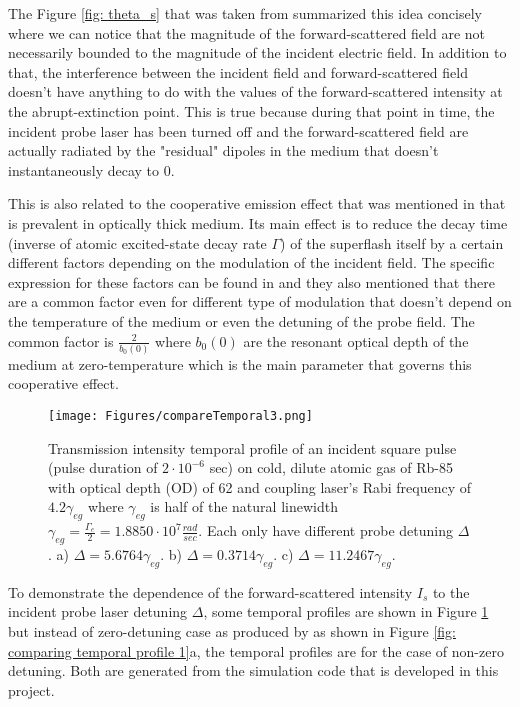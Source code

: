 The Figure \ref{fig: theta_s} that was taken from \cite{Kwong2014} summarized this idea concisely where we can notice that the magnitude of the forward-scattered field are not necessarily bounded to the magnitude of the incident electric field. In addition to that, the interference between the incident field and forward-scattered field doesn't have anything to do with the values of the forward-scattered intensity at the abrupt-extinction point. This is true because during that point in time, the incident probe laser has been turned off and the forward-scattered field are actually radiated by the "residual" dipoles in the medium that doesn't instantaneously decay to $0$.

This is also related to the cooperative emission effect that was mentioned in \cite{Kwong2014, Kwong2015, Kwong2017, Araujo2016} that is prevalent in optically thick medium. Its main effect is to reduce the decay time (inverse of atomic excited-state decay rate $\Gamma$) of the superflash itself by a certain different factors depending on the modulation of the incident field. The specific expression for these factors can be found in \cite{Kwong2017} and they also mentioned that there are a common factor even for different type of modulation that doesn't depend on the temperature of the medium or even the detuning of the probe field. The common factor is $\frac{2}{b_{0}(0)}$ where $b_{0}(0)$ are the resonant optical depth of the medium at zero-temperature which is the main parameter that governs this cooperative effect.

\begin{figure}[h!]
    \centering
    \texttt{[image: Figures/compareTemporal3.png]}
    \caption{Transmission intensity temporal profile of an incident square pulse (pulse duration of $2\cdot10^{-6}$ sec) on cold, dilute atomic gas of Rb-85 with optical depth (OD) of 62 and coupling laser's Rabi frequency of $4.2\gamma_{eg}$ where $\gamma_{eg}$ is half of the natural linewidth $\gamma_{eg} = \frac{\Gamma_{e}}{2} = 1.8850 \cdot 10^{7} \frac{rad}{sec}$. Each only have different probe detuning $\Delta$. a) $\Delta = 5.6764\gamma_{eg}$. b) $\Delta = 0.3714\gamma_{eg}$. c) $\Delta = 11.2467\gamma_{eg}$.}
    \label{fig: comparing temporal profile 2}
\end{figure}

To demonstrate the dependence of the forward-scattered intensity $I_{s}$ to the incident probe laser detuning $\Delta$, some temporal profiles are shown in Figure \ref{fig: comparing temporal profile 2} but instead of zero-detuning case as produced by \cite{jeong2010slow} as shown in Figure \ref{fig: comparing temporal profile 1}a, the temporal profiles are for the case of non-zero detuning. Both are generated from the simulation code that is developed in this project.

